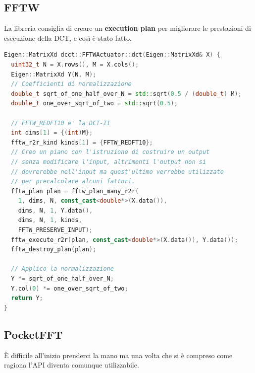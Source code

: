 \documentclass[a4paper,11pt,oneside, table]{article}
\begin{document}
\subsection{FFTW}

La libreria consiglia di creare un \textbf{execution plan} per migliorare le prestazioni di esecuzione della DCT, e cos\`i \`e stato fatto.

\begin{lstlisting}[language=C++]
Eigen::MatrixXd dcct::FFTWActuator::dct(Eigen::MatrixXd& X) {
  uint32_t N = X.rows(), M = X.cols();
  Eigen::MatrixXd Y(N, M);
  // Coefficienti di normalizzazione
  double_t sqrt_of_one_half_over_N = std::sqrt(0.5 / (double_t) M);
  double_t one_over_sqrt_of_two = std::sqrt(0.5);

  // FFTW_REDFT10 e' la DCT-II
  int dims[1] = {(int)M}; 
  fftw_r2r_kind kinds[1] = {FFTW_REDFT10};
  // Creo un piano con l'istruzione di costruire un output
  // senza modificare l'input, altrimenti l'output non si
  // dovrerebbe nell'input ma quest'ultimo verrebbe utilizzato
  // per precalcolare alcuni fattori.
  fftw_plan plan = fftw_plan_many_r2r(
    1, dims, N, const_cast<double*>(X.data()),
    dims, N, 1, Y.data(),
    dims, N, 1, kinds,
    FFTW_PRESERVE_INPUT);
  fftw_execute_r2r(plan, const_cast<double*>(X.data()), Y.data());
  fftw_destroy_plan(plan);

  // Applico la normalizzazione
  Y *= sqrt_of_one_half_over_N;
  Y.col(0) *= one_over_sqrt_of_two;
  return Y;
}
\end{lstlisting}

\subsection{PocketFFT}

\`E difficile all'inizio prenderci la mano ma una volta che si \`e compreso come ragiona l'API diventa comunque utilizzabile.
\end{document}
